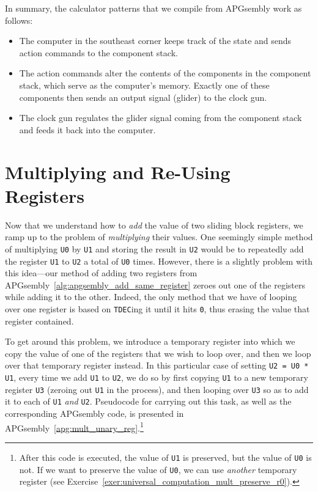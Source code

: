 In summary, the calculator patterns that we compile from APGsembly work as follows:\smallskip

\begin{itemize}
	\item The computer in the southeast corner keeps track of the state and sends action commands to the component stack.\smallskip
	
	\item The action commands alter the contents of the components in the component stack, which serve as the computer's memory. Exactly one of these components then sends an output signal (glider) to the clock gun.\smallskip
	
	\item The clock gun regulates the glider signal coming from the component stack and feeds it back into the computer.
\end{itemize}


\section{Multiplying and Re-Using Registers}\label{sec:multiply_two_registers}

Now that we understand how to \emph{add} the value of two sliding block registers, we ramp up to the problem of \emph{multiplying} their values. One seemingly simple method of multiplying \texttt{U0} by \texttt{U1} and storing the result in \texttt{U2} would be to repeatedly add the register \texttt{U1} to \texttt{U2} a total of \texttt{U0} times. However, there is a slightly problem with this idea---our method of adding two registers from APGsembly~\ref{alg:apgsembly_add_same_register} zeroes out one of the registers while adding it to the other. Indeed, the only method that we have of looping over one register is based on \texttt{TDEC}ing it until it hits \texttt{0}, thus erasing the value that register contained.

To get around this problem, we introduce a temporary register into which we copy the value of one of the registers that we wish to loop over, and then we loop over that temporary register instead. In this particular case of setting \texttt{U2 = U0 * U1}, every time we add \texttt{U1} to \texttt{U2}, we do so by first copying \texttt{U1} to a new temporary register \texttt{U3} (zeroing out \texttt{U1} in the process), and then looping over \texttt{U3} so as to add it to each of \texttt{U1} \emph{and} \texttt{U2}. Pseudocode for carrying out this task, as well as the corresponding APGsembly code, is presented in APGsembly~\ref{apg:mult_unary_reg}.\footnote{After this code is executed, the value of \texttt{U1} is preserved, but the value of \texttt{U0} is not. If we want to preserve the value of \texttt{U0}, we can use \emph{another} temporary register (see Exercise~\ref{exer:universal_computation_mult_preserve_r0}).}

